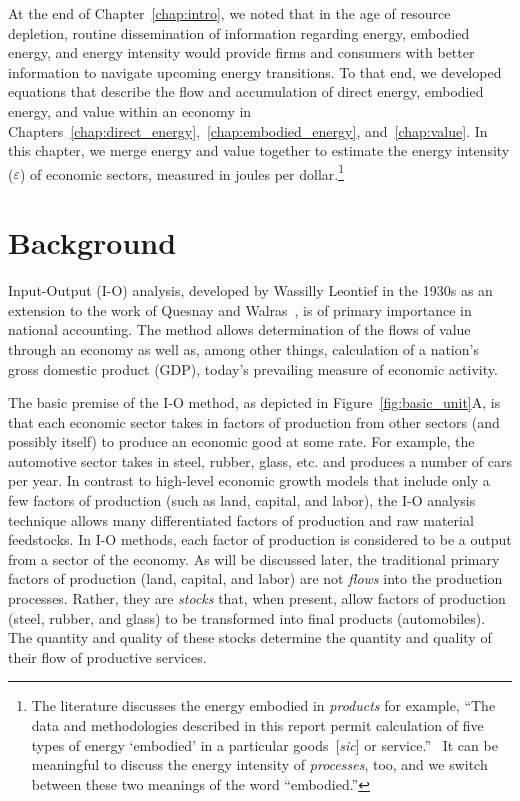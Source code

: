 At the end of Chapter~\ref{chap:intro}, 
we noted that in the age of resource depletion,
routine dissemination of information regarding
energy, embodied energy, and energy intensity would
provide firms and consumers with better information to
navigate upcoming energy transitions.
To that end, we developed equations that describe the
flow and accumulation of direct energy, embodied energy, and value within an economy
in Chapters~\ref{chap:direct_energy},~\ref{chap:embodied_energy}, and~\ref{chap:value}.
In this chapter, we merge energy and value together to estimate
the energy intensity ($\varepsilon$) of economic sectors,
measured in joules per dollar.\footnote{The literature discusses 
the energy embodied in \emph{products} for example, ``The data and methodologies described in this report 
permit calculation of five types of energy `embodied' 
in a particular goods~[\emph{sic}] or service.''~\cite[p.~268]{Bullard:1978vd} %
It can be meaningful to discuss the energy intensity of \emph{processes}, too,
and we switch between these two meanings of the word ``embodied.''}


\section{Background}
\label{sec:IO_background}

Input-Output (I-O) analysis, developed by Wassilly Leontief in the 1930s 
as an extension to the work of Quesnay and Walras~\cite{Leontief1936}, 
is of primary importance in national accounting. 
The method allows determination of the flows of value through
an economy as well as, 
among other things, 
calculation of a nation's gross domestic product (GDP), 
today's prevailing measure of economic activity.

The basic premise of the I-O method, 
as depicted in Figure~\ref{fig:basic_unit}A, 
is that each economic sector takes in factors of production 
from other sectors (and possibly itself) 
to produce an economic good at some rate. 
For example, the automotive sector takes in steel, rubber, glass, etc. 
and produces a number of cars per year. 
In contrast to high-level economic growth models 
that include only a few factors of production (such as land, capital, and labor), 
the I-O analysis technique allows many differentiated factors of production 
and raw material feedstocks.\cite{Costanza:1980ww} 
In I-O methods, each factor of production 
is considered to be a output from a sector of the economy. 
As will be discussed later,
the traditional primary factors of production (land, capital, and labor) 
are not \emph{flows} into the production processes. 
Rather, they are \emph{stocks} that, when present, 
allow factors of production (steel, rubber, and glass) 
to be transformed into final products (automobiles). 
The quantity and quality of these stocks 
determine the quantity and quality of their flow of productive services.

